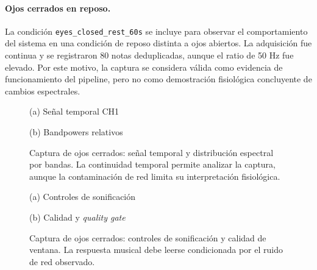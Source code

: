 \documentclass[../main.tex]{subfiles}
\begin{document}
\paragraph{Ojos cerrados en reposo.}
La condición \texttt{eyes\_closed\_rest\_60s} se incluye para observar el comportamiento del sistema en una condición de reposo distinta a ojos abiertos. La adquisición fue continua y se registraron 80 notas deduplicadas, aunque el ratio de 50 Hz fue elevado. Por este motivo, la captura se considera válida como evidencia de funcionamiento del pipeline, pero no como demostración fisiológica concluyente de cambios espectrales.

\begin{figure}[htbp]
    \centering
    \begin{minipage}{0.49\textwidth}
        \centering
        \small (a) Señal temporal CH1
    \end{minipage}
    \hfill
    \begin{minipage}{0.49\textwidth}
        \centering
        \small (b) Bandpowers relativos
    \end{minipage}
    \caption{Captura de ojos cerrados: señal temporal y distribución espectral por bandas. La continuidad temporal permite analizar la captura, aunque la contaminación de red limita su interpretación fisiológica.}
    \label{fig:validacion_s01_02_eeg_bands}
\end{figure}

\begin{figure}[htbp]
    \centering
    \begin{minipage}{0.49\textwidth}
        \centering
        \small (a) Controles de sonificación
    \end{minipage}
    \hfill
    \begin{minipage}{0.49\textwidth}
        \centering
        \small (b) Calidad y \textit{quality gate}
    \end{minipage}
    \caption{Captura de ojos cerrados: controles de sonificación y calidad de ventana. La respuesta musical debe leerse condicionada por el ruido de red observado.}
    \label{fig:validacion_s01_02_controls_quality}
\end{figure}
\end{document}
